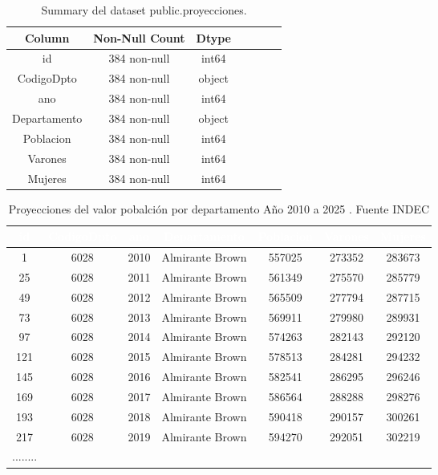 \documentclass{article}
\theoremstyle{mytheoremstyle}
\theoremstyle{mytheoremstyle}
\theoremstyle{myproblemstyle}
\begin{document}
 \begin{table}[htbp]
  \centering
  \begin{tabular}{ccccccc}
  \toprule
  \textbf{Column} & \textbf{Non-Null Count} & \textbf{Dtype} \\
  \midrule
  id            & 384 non-null & int64 \\
  CodigoDpto    & 384 non-null & object \\
  ano           & 384 non-null & int64 \\
  Departamento  & 384 non-null & object \\
  Poblacion     & 384 non-null & int64 \\
  Varones       & 384 non-null & int64 \\
  Mujeres       & 384 non-null & int64 \\
  \bottomrule
  \end{tabular}
  \caption{Summary del dataset public.proyecciones.}
  \label{tab:ProyeccSummary}
  \end{table}

  \begin{table}[htb]
    \centering
    \begin{tabular}{|c|c|c|c|c|c|c|}
    \hline
    \textbf{\cellcolor[rgb]{0,0.231,0.427}\textcolor{white}{id}} & \textbf{\cellcolor[rgb]{0,0.231,0.427}\textcolor{white}{CodigoDpto}} & \textbf{\cellcolor[rgb]{0,0.231,0.427}\textcolor{white}{ano}} & \textbf{\cellcolor[rgb]{0,0.231,0.427}\textcolor{white}{Departamento}} & \textbf{\cellcolor[rgb]{0,0.231,0.427}\textcolor{white}{Poblacion}} & \textbf{\cellcolor[rgb]{0,0.231,0.427}\textcolor{white}{Varones}} & \textbf{\cellcolor[rgb]{0,0.231,0.427}\textcolor{white}{Mujeres}} \\ \hline
    1 & 6028 & 2010 & Almirante Brown & 557025 & 273352 & 283673 \\
    25 & 6028 & 2011 & Almirante Brown & 561349 & 275570 & 285779 \\
    49 & 6028 & 2012 & Almirante Brown & 565509 & 277794 & 287715 \\
    73 & 6028 & 2013 & Almirante Brown & 569911 & 279980 & 289931 \\
    97 & 6028 & 2014 & Almirante Brown & 574263 & 282143 & 292120 \\
    121 & 6028 & 2015 & Almirante Brown & 578513 & 284281 & 294232 \\
    145 & 6028 & 2016 & Almirante Brown & 582541 & 286295 & 296246 \\
    169 & 6028 & 2017 & Almirante Brown & 586564 & 288288 & 298276 \\
    193 & 6028 & 2018 & Almirante Brown & 590418 & 290157 & 300261 \\
    217 & 6028 & 2019 & Almirante Brown & 594270 & 292051 & 302219 \\
    ........ &&&&&& \\
    \hline
    \end{tabular}
    \caption{ Proyecciones del valor pobalción por departamento Año 2010 a 2025 . Fuente INDEC}
    \label{tab:proyecHead}
    \end{table}
\end{document}
